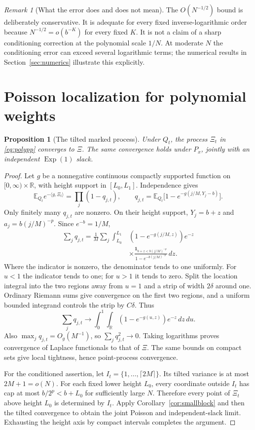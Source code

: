 \documentclass[11pt,a4paper]{article}
\numberwithin{equation}{section}
\newtheorem{proposition}[theorem]{Proposition}
\theoremstyle{definition}
\theoremstyle{remark}
\newtheorem{remark}[theorem]{Remark}
\newcommand{\E}{\mathbb E}
\newcommand{\R}{\mathbb R}
\newcommand{\ind}{\mathbf 1}
\newcommand{\Exp}{\operatorname{Exp}}
\begin{document}
\begin{remark}[What the error does and does not mean]
The $O(N^{-1/2})$ bound is deliberately conservative. It is adequate
for every fixed inverse-logarithmic order because
$N^{-1/2}=o(b^{-K})$ for every fixed $K$. It is not a claim of a
sharp conditioning correction at the polynomial scale $1/N$.
At moderate $N$ the conditioning error can exceed several logarithmic
terms; the numerical results in Section~\ref{sec:numerics} illustrate
this explicitly.
\end{remark}

\section{Poisson localization for polynomial weights}
\label{sec:poisson}

\begin{proposition}[The tilted marked process]
\label{prop:polypp}
Under $Q_t$, the process $\Xi_t$ in \eqref{eq:polypp} converges to
$\Xi$. The same convergence holds under $P_x$, jointly with an
independent $\Exp(1)$ slack.
\end{proposition}
\begin{proof}
Let $g$ be a nonnegative continuous compactly supported function on
$[0,\infty)\times\R$, with height support in $[L_0,L_1]$. Independence
gives
\[
 \E_{Q_t}e^{-\langle g,\Xi_t\rangle}
   =\prod_j(1-q_{j,t}),\qquad
 q_{j,t}=\E_{Q_t}\big[1-e^{-g(j/M,Y_j-b)}\big].
\]
Only finitely many $q_{j,t}$ are nonzero. On their height support,
$Y_j=b+z$ and $a_j=b(j/M)^{-p}$. Since $e^{-b}=1/M$,
\begin{align}
 \sum_jq_{j,t}
  =\frac1M\sum_j\int_{L_0}^{L_1}
 &(1-e^{-g(j/M,z)})e^{-z}\nonumber\\[-2mm]
 &\times\frac{\ind_{b+z<b(j/M)^{-p}}}
               {1-e^{-b(j/M)^{-p}}}\,dz.
 \label{eq:pp-riemann}
\end{align}
Where the indicator is nonzero, the denominator tends to one
uniformly. For $u<1$ the indicator tends to one; for $u>1$ it tends
to zero. Split the location integral into the two regions away from
$u=1$ and a strip of width $2\delta$ around one. Ordinary Riemann
sums give convergence on the first two regions, and a uniform bounded
integrand controls the strip by $C\delta$. Thus
\[
 \sum_jq_{j,t}\longrightarrow
 \int_0^1\int_\R(1-e^{-g(u,z)})e^{-z}\,dz\,du.
\]
Also $\max_jq_{j,t}=O_g(M^{-1})$, so
$\sum_jq_{j,t}^2\to0$. Taking logarithms proves convergence of
Laplace functionals to that of $\Xi$. The same bounds on compact
sets give local tightness, hence point-process convergence.

For the conditioned assertion, let $I_t=\{1,\ldots,\lceil2M\rceil\}$.
Its tilted variance is at most $2M+1=o(N)$. For each fixed lower
height $L_0$, every coordinate outside $I_t$ has cap at most
$b/2^p<b+L_0$ for sufficiently large $N$. Therefore every point of
$\Xi_t$ above height $L_0$ is determined by $I_t$. Apply
Corollary~\ref{cor:smallblock} and then the tilted convergence to
obtain the joint Poisson and independent-slack limit. Exhausting the
height axis by compact intervals completes the argument.
\end{proof}
\end{document}
